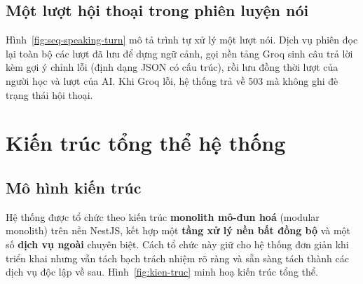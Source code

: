 \subsection{Một lượt hội thoại trong phiên luyện nói}
\label{subsec:seq-speaking-turn}

Hình~\ref{fig:seq-speaking-turn} mô tả trình tự xử lý một lượt nói. Dịch vụ
phiên đọc lại toàn bộ các lượt đã lưu để dựng ngữ cảnh, gọi nền tảng Groq sinh
câu trả lời kèm gợi ý chỉnh lỗi (định dạng JSON có cấu trúc), rồi lưu đồng thời
lượt của người học và lượt của AI. Khi Groq lỗi, hệ thống trả về 503 mà không
ghi đè trạng thái hội thoại.


\section{Kiến trúc tổng thể hệ thống}
\label{sec:kien-truc}

\subsection{Mô hình kiến trúc}
\label{subsec:mo-hinh-kien-truc}

Hệ thống được tổ chức theo kiến trúc \textbf{monolith mô-đun hoá}
(modular monolith) trên nền NestJS, kết hợp một \textbf{tầng xử lý nền bất
đồng bộ} và một số \textbf{dịch vụ ngoài} chuyên biệt. Cách tổ chức này giữ
cho hệ thống đơn giản khi triển khai nhưng vẫn tách bạch trách nhiệm rõ
ràng và sẵn sàng tách thành các dịch vụ độc lập về sau. Hình~\ref{fig:kien-truc}
minh hoạ kiến trúc tổng thể.

